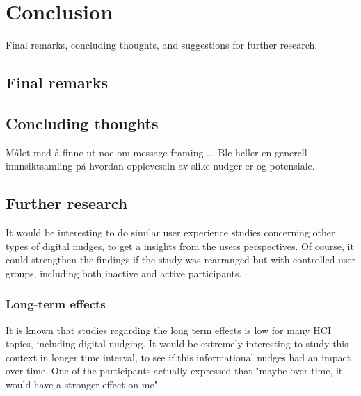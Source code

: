 \chapter{Conclusion} 

Final remarks, concluding thoughts, and suggestions for further research.
\section{Final remarks}

\section{Concluding thoughts}
Målet med å finne ut noe om message framing ...
Ble heller en generell innnsiktsamling på hvordan oppleveseln av slike nudger er og potensiale. 

\section{Further research}

It would be interesting to do similar user experience studies concerning other types of digital nudges, to get a insights from the users perspectives. Of course, it could strengthen the findings if the study was rearranged but with controlled user groups, including both inactive and active participants.   

\subsection{Long-term effects}
It is known that studies regarding the long term effects is low for many HCI topics, including digital nudging. It would be extremely interesting to study this context in longer time interval, to see if this informational nudges had an impact over time. One of the participants actually expressed that "maybe over time, it would have a stronger effect on me". 